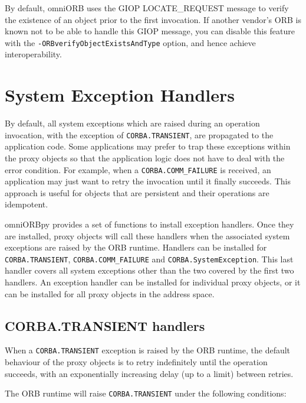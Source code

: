 \documentclass[11pt,twoside,a4paper]{book}
\newcommand{\code}[1]{\texttt{#1}}
\newcommand{\cmdline}[1]{\texttt{#1}}
\newcommand{\dsc}{\discretionary{}{}{}}
\begin{document}
By default, omniORB uses the GIOP LOCATE\_REQUEST message to verify
the existence of an object prior to the first invocation. If another
vendor's ORB is known not to be able to handle this GIOP message, you
can disable this feature with the
\cmdline{-ORBverifyObjectExistsAndType} option, and hence achieve
interoperability.




\section{System Exception Handlers}
\label{sec:exHandlers}

By default, all system exceptions which are raised during an operation
invocation, with the exception of \code{CORBA.TRANSIENT}, are
propagated to the application code. Some applications may prefer to
trap these exceptions within the proxy objects so that the application
logic does not have to deal with the error condition. For example,
when a \code{CORBA.COMM\_FAILURE} is received, an application may just
want to retry the invocation until it finally succeeds. This approach
is useful for objects that are persistent and their operations are
idempotent.

omniORBpy provides a set of functions to install exception handlers.
Once they are installed, proxy objects will call these handlers when
the associated system exceptions are raised by the ORB runtime.
Handlers can be installed for \code{CORBA.\dsc{}TRANSIENT},
\code{CORBA.COMM\_FAILURE} and \code{CORBA.SystemException}.  This
last handler covers all system exceptions other than the two covered
by the first two handlers. An exception handler can be installed for
individual proxy objects, or it can be installed for all proxy objects
in the address space.


\subsection{CORBA.TRANSIENT handlers}

When a \code{CORBA.TRANSIENT} exception is raised by the ORB runtime,
the default behaviour of the proxy objects is to retry indefinitely
until the operation succeeds, with an exponentially increasing delay
(up to a limit) between retries.

The ORB runtime will raise \code{CORBA.TRANSIENT} under the following
conditions:
\end{document}
